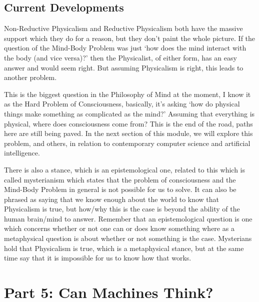 \section{Current Developments}
Non-Reductive Physicalism and Reductive Physicalism both have the massive support which they do for a reason, but they don't paint the whole picture. If the question of the Mind-Body Problem was just ‘how does the mind interact with the body (and vice versa)?' then the Physicalist, of either form, has an easy answer and would seem right. But assuming Physicalism is right, this leads to another problem. 


This is the biggest question in the Philosophy of Mind at the moment, I know it as the Hard Problem of Consciousness, basically, it's asking `how do physical things make something as complicated as the mind?' Assuming that everything is physical, where does consciousness come from? This is the end of the road, paths here are still being paved. In the next section of this module, we will explore this problem, and others, in relation to contemporary computer science and artificial intelligence.

There is also a stance, which is an epistemological one, related to this which is called mysterianism which states that the problem of consciousness and the Mind-Body Problem in general is not possible for us to solve. It can also be phrased as saying that we know enough about the world to know that Physicalism is true, but how/why this is the case is beyond the ability of the human brain/mind to answer. Remember that an epistemological question is one which concerns whether or not one can or does know something where as a metaphysical question is about whether or not something is the case. Mysterians hold that Physicalism is true, which is a metaphysical stance, but at the same time say that it is impossible for us to know how that works.


\chapter{Part 5: Can Machines Think?}
